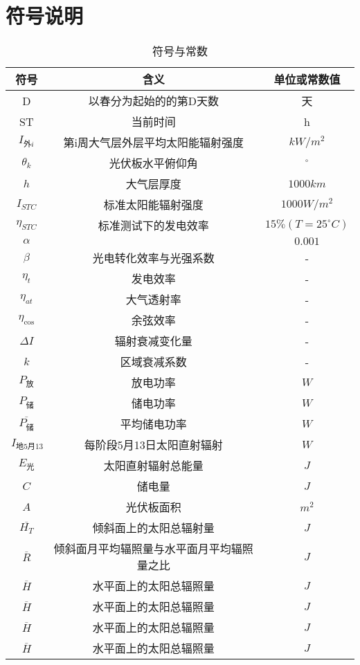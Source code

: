 \documentclass[withoutpreface,bwprint]{cumcmthesis} %
\begin{document}
\newpage



\section{符号说明}

\begin{table}[!htbp]
    \caption{符号与常数}\label{tab:001} \centering
    \setlength{\tabcolsep}{15pt}
    \begin{tabular}{ccc}
        \toprule[1.5pt]
        符号 & 含义 & 单位或常数值\\
        \midrule[1pt]
        D & 以春分为起始的的第D天数 & 天\\
        ST & 当前时间 & h\\
        $I_{\mbox{外}i}$ & 第i周大气层外层平均太阳能辐射强度 & $kW/m^{2}$\\
        $\theta_{k}$ & 光伏板水平俯仰角 & $^{\circ}$\\
        $h$ & 大气层厚度 & $1000km$\\
        $I_{STC}$ & 标准太阳能辐射强度 & $1000W/m^{2}$\\
        $\eta_{STC}$ & 标准测试下的发电效率 & $15\%(T=25^{\circ}C)$\\
        $\alpha$ &  & $0.001$\\
        $\beta$ & 光电转化效率与光强系数 & -\\
        $\eta_{t}$ & 发电效率 & -\\
        $\eta_{at}$ & 大气透射率 & -\\
        $\eta_{\cos}$ & 余弦效率 & -\\
        $\Delta I$ & 辐射衰减变化量 & -\\
        $k$ & 区域衰减系数 & -\\
        $P_{\mbox{放}}$ & 放电功率 & $W$\\
        $P_{\mbox{储}}$ & 储电功率 & $W$\\
        $\overline{P_{\mbox{储}}}$ & 平均储电功率 & $W$\\
        $I_{\mbox{地5月13}}$ & 每阶段5月13日太阳直射辐射 & $W$\\
        $E_{\mbox{光}}$ & 太阳直射辐射总能量 & $J$\\
        $C$ & 储电量 & $J$\\
        $A$ & 光伏板面积 & $m^{2}$\\
        $\overline{H_{T}}$ & 倾斜面上的太阳总辐射量 & $J$\\
        $\overline{R}$ & 倾斜面月平均辐照量与水平面月平均辐照量之比 & $J$\\
        $\overline{H}$ & 水平面上的太阳总辐照量 & $J$\\
        $\overline{H}$ & 水平面上的太阳总辐照量 & $J$\\
        $\overline{H}$ & 水平面上的太阳总辐照量 & $J$\\
        $\overline{H}$ & 水平面上的太阳总辐照量 & $J$\\
        \bottomrule[1.5pt]
    \end{tabular}
\end{table}
\end{document}
